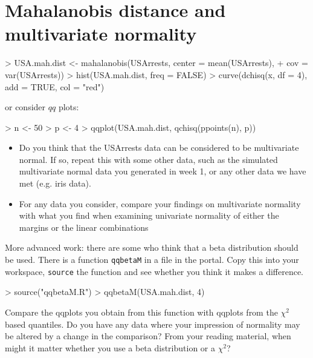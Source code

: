 
\section{Mahalanobis distance and multivariate normality}

\begin{Schunk}
\begin{Sinput}
> USA.mah.dist <- mahalanobis(USArrests, center = mean(USArrests), 
+     cov = var(USArrests))
> hist(USA.mah.dist, freq = FALSE)
> curve(dchisq(x, df = 4), add = TRUE, col = "red")
\end{Sinput}
\end{Schunk}

or consider $qq$ plots:

\begin{Schunk}
\begin{Sinput}
> n <- 50
> p <- 4
> qqplot(USA.mah.dist, qchisq(ppoints(n), p))
\end{Sinput}
\end{Schunk}


\begin{itemize}
\item Do you think that the USArrests data can be considered to be multivariate normal.   If so, repeat this with some other data, such as the simulated multivariate normal data you generated in week 1, or any other data we have met (e.g. iris data).
\item For any data you consider, compare your findings on multivariate normality with what you find when examining univariate normality of either the margins or the linear combinations
\end{itemize}

More advanced work: there are some who think that a beta distribution should be used.   There is a function \texttt{qqbetaM} in a file in the portal.   Copy this into your workspace, \texttt{source} the function and see whether you think it makes a difference.     

\begin{Schunk}
\begin{Sinput}
> source("qqbetaM.R")
> qqbetaM(USA.mah.dist, 4)
\end{Sinput}
\end{Schunk}

Compare the qqplots you obtain from this function with qqplots from the $\chi^{2}$ based quantiles.   Do you have any data where your impression of normality may be altered by a change in the comparison?   From your reading material, when might it matter whether you use a beta distribution or a $\chi^{2}$?

